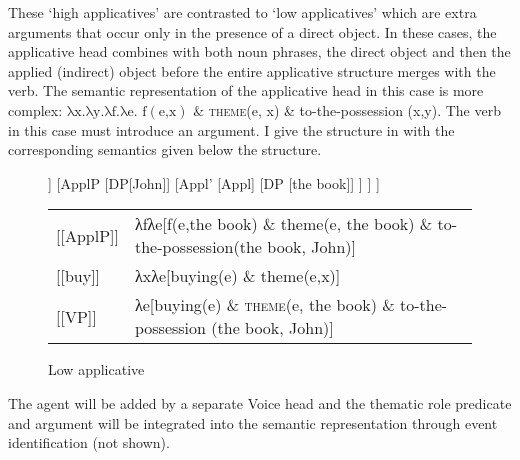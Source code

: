\documentclass[output=paper,colorlinks,citecolor=brown,modfonts,nonflat]{langsci/langscibook}
\begin{document}

These ‘high applicatives’ are contrasted to ‘low applicatives’ which are extra arguments that occur only in the presence of a direct object. In these cases, the applicative head combines with both noun phrases, the direct object and then the applied (indirect) object before the entire applicative structure merges with the verb. The semantic representation of the applicative head in this case is more complex:  $\text{λx.λy.λf.λe}\text{. f}\left(\text{e,x}\right)\text{ \&} $  \textsc{theme}(e, x) \& to-the-possession (x,y). The verb in this case must introduce an argument. I give the structure in  with the corresponding semantics given below the structure.


\begin{figure}
	\begin{forest}
		[VP
			[V [buy]]
			[ApplP
				[DP[John]]
				[Appl'
					[Appl]
					[DP [the book]]
				]
			]
		]
	\end{forest}

	\begin{tabular}{l p{8cm}}
		{[}{[}ApplP{]}{]}  &  λfλe{[}f(e,the book) \& theme(e, the book) \& to-the-possession(the book, John){]}\\
		{[}{[}buy{]}{]} &  λxλe{[}buying(e) \& theme(e,x){]}\\
		{[}{[}VP{]}{]} &  λe{[}buying(e) \& \textsc{theme}(e, the book) \& to-the-possession (the book, John){]}
	\end{tabular}

	\caption{\label{fig:basilico:2} Low applicative}
\end{figure}


The agent will be added by a separate Voice head and the thematic role predicate and argument will be integrated into the semantic representation through event identification (not shown).
\end{document}
